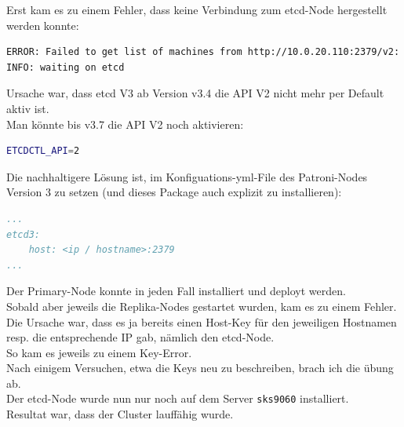 \begin{flushleft}
    Erst kam es zu einem Fehler, dass keine Verbindung zum \gls{etcd}-Node hergestellt werden konnte:
\lstset{style=gra_codestyle}
\begin{lstlisting}[language=bash, caption=Patroni - etcd API V2 Error,captionpos=b,label={lst:patroni_etcd_api_v2_error},breaklines=true]
ERROR: Failed to get list of machines from http://10.0.20.110:2379/v2: EtcdException('Bad response : 404 page not found\n')
INFO: waiting on etcd
\end{lstlisting}
    Ursache war, dass \gls{etcd} V3 ab Version v3.4 die API V2 nicht mehr per Default aktiv ist.\\
    Man könnte bis v3.7 die API V2 noch aktivieren:
\lstset{style=gra_codestyle}
\begin{lstlisting}[language=bash, caption=Patroni - etcd API V2 Enable,captionpos=b,label={lst:patroni_etcd_api_v2_enable},breaklines=true]
ETCDCTL_API=2
\end{lstlisting}
    Die nachhaltigere Lösung ist, im Konfiguations-yml-File des Patroni-Nodes Version 3 zu setzen (und dieses Package auch explizit zu installieren):
\lstset{style=gra_codestyle}
\begin{lstlisting}[language=yaml, caption=Patroni - etcd3 Flag,captionpos=b,label={lst:patroni_etcd3_flag},breaklines=true]
...
etcd3:
    host: <ip / hostname>:2379
...
\end{lstlisting}
\end{flushleft}
\begin{flushleft}
    Der Primary-Node konnte in jeden Fall installiert und deployt werden.\\
    Sobald aber jeweils die Replika-Nodes gestartet wurden, kam es zu einem Fehler.\\
    Die Ursache war, dass es ja bereits einen Host-Key für den jeweiligen Hostnamen resp.
    die entsprechende IP gab, nämlich den \gls{etcd}-Node.\\
    So kam es jeweils zu einem Key-Error.\\
    Nach einigem Versuchen, etwa die Keys neu zu beschreiben, brach ich die übung ab.\\
    Der \gls{etcd}-Node wurde nun nur noch auf dem Server \texttt{sks9060} installiert.\\
    Resultat war, dass der Cluster lauffähig wurde.\\
\end{flushleft}
